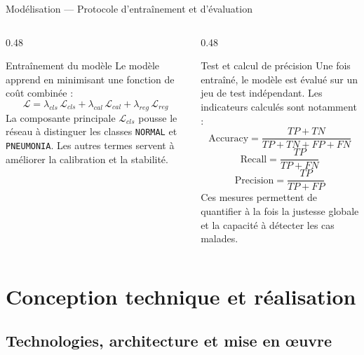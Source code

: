 \begin{frame}[t]{Modélisation --- Protocole d'entraînement et d'évaluation}
\small
\begin{columns}[T,onlytextwidth]
\begin{column}{0.48\textwidth}
\begin{block}{Entraînement du modèle}
Le modèle apprend en minimisant une fonction de coût combinée :
\[
\mathcal{L}=\lambda_{cls}\,\mathcal{L}_{cls}+\lambda_{cal}\,\mathcal{L}_{cal}+\lambda_{reg}\,\mathcal{L}_{reg}
\]
La composante principale $\mathcal{L}_{cls}$ pousse le réseau à distinguer les classes \texttt{NORMAL} et \texttt{PNEUMONIA}. Les autres termes servent à améliorer la calibration et la stabilité.
\end{block}
\end{column}
\begin{column}{0.48\textwidth}
\begin{block}{Test et calcul de précision}
Une fois entraîné, le modèle est évalué sur un jeu de test indépendant. Les indicateurs calculés sont notamment :
\[
\mathrm{Accuracy}=\frac{TP+TN}{TP+TN+FP+FN}
\]
\[
\mathrm{Recall}=\frac{TP}{TP+FN}
\]
\[
\mathrm{Precision}=\frac{TP}{TP+FP}
\]
Ces mesures permettent de quantifier à la fois la justesse globale et la capacité à détecter les cas malades.
\end{block}
\end{column}
\end{columns}
\end{frame}

\chapter{Conception technique et réalisation}
\section{Technologies, architecture et mise en œuvre}

